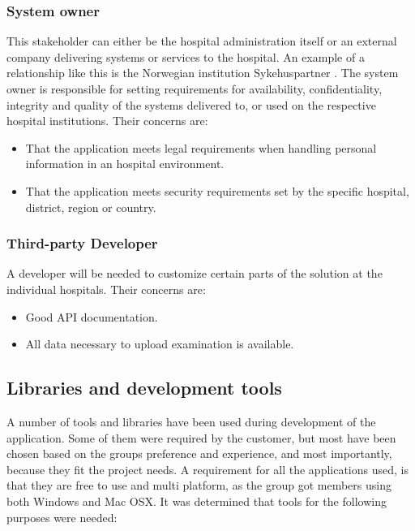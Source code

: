 \subsubsection{System owner}
This stakeholder can either be the hospital administration itself or an external company delivering systems or services to the hospital. An example of a relationship like this is the Norwegian institution Sykehuspartner \cite{sykehuspartner}. The system owner is responsible for setting requirements for availability, confidentiality, integrity and quality of the systems delivered to, or used on the respective hospital institutions. Their concerns are:

\begin{itemize}
\item That the application meets legal requirements when handling personal information in an hospital environment.
\item That the application meets security requirements set by the specific hospital, district, region or country.
\end{itemize}

\subsubsection{Third-party Developer}
A developer will be needed to customize certain parts of the solution at the individual hospitals. Their concerns are:

\begin{itemize}
\item Good API documentation.
\item All data necessary to upload examination is available.
\end{itemize}




\subsection{Libraries and development tools}

A number of tools and libraries have been used during development of the application. Some of them were required by the customer, but most have been chosen based on the groups preference and experience, and most importantly, because they fit the project needs. A requirement for all the applications used, is that they are free to use and multi platform, as the group got members using both Windows and Mac OSX. It was determined that tools for the following purposes were needed:

